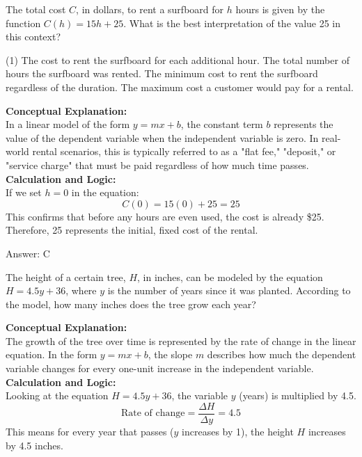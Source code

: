 \documentclass[11pt,paper=a4,answers]{exam}
\begin{document}
\begin{questions}
\pointsinrightmargin
\pointsdroppedatright
\marksnotpoints
{}
\pointformat{\boldmath\themarginpoints}
\bracketedpoints

\question
The total cost $C$, in dollars, to rent a surfboard for $h$ hours is given by the function $C(h) = 15h + 25$. What is the best interpretation of the value 25 in this context?
\begin{tasks}(1)
    \task The cost to rent the surfboard for each additional hour.
    \task The total number of hours the surfboard was rented.
    \task The minimum cost to rent the surfboard regardless of the duration.
    \task The maximum cost a customer would pay for a rental.
\end{tasks}

\begin{solution}
\textbf{Conceptual Explanation:} \\
In a linear model of the form $y = mx + b$, the constant term $b$ represents the value of the dependent variable when the independent variable is zero. In real-world rental scenarios, this is typically referred to as a "flat fee," "deposit," or "service charge" that must be paid regardless of how much time passes.
\\[10pt]
\textbf{Calculation and Logic:} \\
If we set $h = 0$ in the equation:
\[C(0) = 15(0) + 25 = 25\]
This confirms that before any hours are even used, the cost is already \$25. Therefore, 25 represents the initial, fixed cost of the rental.

\vspace{15pt}
Answer: \colorbox{yellow!100}{C}
\end{solution}

\question
The height of a certain tree, $H$, in inches, can be modeled by the equation $H = 4.5y + 36$, where $y$ is the number of years since it was planted. According to the model, how many inches does the tree grow each year?

\begin{solution}
\textbf{Conceptual Explanation:} \\
The growth of the tree over time is represented by the rate of change in the linear equation. In the form $y = mx + b$, the slope $m$ describes how much the dependent variable changes for every one-unit increase in the independent variable.
\\[10pt]
\textbf{Calculation and Logic:} \\
Looking at the equation $H = 4.5y + 36$, the variable $y$ (years) is multiplied by 4.5. 
\[\text{Rate of change} = \frac{\Delta H}{\Delta y} = 4.5\]
This means for every year that passes ($y$ increases by 1), the height $H$ increases by 4.5 inches. 


\end{solution}
\end{questions}
\end{document}
